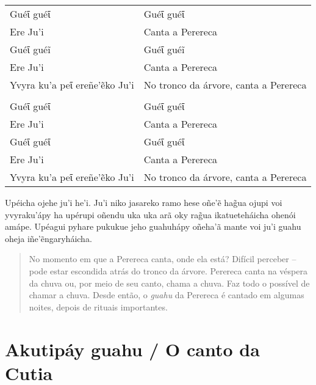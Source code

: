 \begin{itemize}
\begin{table}[]
\begin{tabular}{ll}
Guéῖ guéῖ                     & Guéῖ guéῖ                             \\
Ere Ju'i                      & Canta a Perereca                      \\
Guéῖ guéĩ                     & Guéῖ guéĩ                             \\
Ere Ju'i                      & Canta a Perereca                      \\
Yvyra ku'a peῖ ereñe'ẽko Ju'i & No tronco da árvore, canta a Perereca \\
                              &                                       \\
Guéῖ guéῖ                     & Guéῖ guéῖ                             \\
Ere Ju'i                      & Canta a Perereca                      \\
Guéῖ guéῖ                     & Guéῖ guéῖ                             \\
Ere Ju'i                      & Canta a Perereca                      \\
Yvyra ku'a peῖ ereñe'ẽko Ju'i & No tronco da árvore, canta a Perereca
\end{tabular}
\end{table}

Upéicha ojehe ju'i he'i. Ju'i niko jasareko ramo hese oñe'ẽ hag̃ua ojupi
voi yvyraku'ápy ha upérupi oñendu uka uka arã oky rag̃ua ikatueteháicha
ohenói amápe. Upéagui pyhare pukukue jeho guahuhápy oñeha'ã mante voi
ju'i guahu oheja iñe'ẽngaryháicha.

\begin{quote}
No momento em que a Perereca canta, onde ela está? Difícil perceber --
pode estar escondida atrás do tronco da árvore. Perereca canta na
véspera da chuva ou, por meio de seu canto, chama a chuva. Faz todo o
possível de chamar a chuva. Desde então, o \emph{guahu} da Perereca é
cantado em algumas noites, depois de rituais importantes.
\end{quote}

\chapter{Akutipáy guahu / O canto da Cutia}


\end{itemize}
